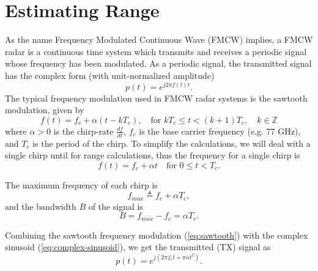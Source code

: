 \chapter{Estimating Range}
As the name Frequency Modulated Continuous Wave (FMCW) implies, a FMCW radar is
a continuous time system which transmits and receives a periodic signal whose 
frequency has been modulated. As a periodic signal, the transmitted signal has
the complex form (with unit-normalized amplitude)
\begin{equation}
	\label{eq:complex-sinusoid}
	p(t) = e^{j2\pi f(t)t}.
\end{equation}
The typical frequency modulation used in FMCW radar systems is the sawtooth
modulation, given by
\cite{iovescufundamentals, wang2008digital}
\begin{equation}
	\label{eq:sawtooth}
	f(t) = f_c + \alpha (t - kT_c), \quad\text{for } kT_c \leq t < (k+1)T_c, \quad
	k \in \mathbb{Z}
\end{equation}
where $\alpha > 0$ is the chirp-rate  $\frac{df}{dt}$, $f_c$ is the base
carrier frequency (e.g. 77 GHz), and $T_c$ is the period of the chirp. To
simplify the calculations, we will deal with a single chirp until for range
calculations, thus the frequency for a single chirp is 
\begin{equation}
	f(t) = f_c + \alpha t \quad\text{for } 0\leq t < T_c.
\end{equation}

The maximum frequency of each chirp is 
\begin{equation}
	f_{max} \triangleq f_c + \alpha T_c,
\end{equation}
and the bandwidth $B$ of the signal is
\begin{equation}
	B = f_{max} - f_c = \alpha T_c.
\end{equation}

Combining the sawtooth frequency modulation (\ref{eq:sawtooth}) with the complex
sinusoid (\ref{eq:complex-sinusoid}), we get
the transmitted (TX) signal as
\begin{equation}
	p(t) = e^{j(2\pi f_c t+ \pi \alpha t^2)}.
\end{equation}

